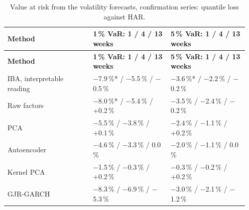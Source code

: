 {\footnotesize\setlength{\tabcolsep}{4pt}\renewcommand{\arraystretch}{1.2}
\begin{longtable}{@{}>{\raggedright\arraybackslash}p{0.338\linewidth}>{\raggedright\arraybackslash}p{0.309\linewidth}>{\raggedright\arraybackslash}p{0.309\linewidth}@{}}
\caption{Value at risk from the volatility forecasts, confirmation series: quantile loss against HAR.}\label{tab:E3}\\
\toprule
\textbf{Method} & \textbf{1\,\% VaR: 1 / 4 / 13 weeks} & \textbf{5\,\% VaR: 1 / 4 / 13 weeks} \\
\midrule
\endfirsthead
\toprule
\textbf{Method} & \textbf{1\,\% VaR: 1 / 4 / 13 weeks} & \textbf{5\,\% VaR: 1 / 4 / 13 weeks} \\
\midrule
\endhead
\bottomrule
\endlastfoot
IBA, interpretable reading & \ensuremath{-}7.9\,\%* / \ensuremath{-}5.5\,\% / \ensuremath{-}0.5\,\% & \ensuremath{-}3.6\,\%* / \ensuremath{-}2.2\,\% / \ensuremath{-}0.2\,\% \\
Raw factors & \ensuremath{-}8.0\,\%* / \ensuremath{-}5.4\,\% / +0.2\,\% & \ensuremath{-}3.5\,\% / \ensuremath{-}2.4\,\% / \ensuremath{-}0.2\,\% \\
PCA & \ensuremath{-}5.5\,\% / \ensuremath{-}3.8\,\% / +0.1\,\% & \ensuremath{-}2.4\,\% / \ensuremath{-}1.1\,\% / +0.2\,\% \\
Autoencoder & \ensuremath{-}4.6\,\% / \ensuremath{-}3.3\,\% / 0.0\,\% & \ensuremath{-}2.0\,\% / \ensuremath{-}1.1\,\% / 0.0\,\% \\
Kernel PCA & \ensuremath{-}1.5\,\% / \ensuremath{-}0.3\,\% / +0.2\,\% & \ensuremath{-}0.3\,\% / \ensuremath{-}0.2\,\% / +0.2\,\% \\
GJR-GARCH & \ensuremath{-}8.3\,\% / \ensuremath{-}6.9\,\% / \ensuremath{-}5.3\,\% & \ensuremath{-}3.0\,\% / \ensuremath{-}2.1\,\% / \ensuremath{-}1.2\,\% \\
\end{longtable}}

